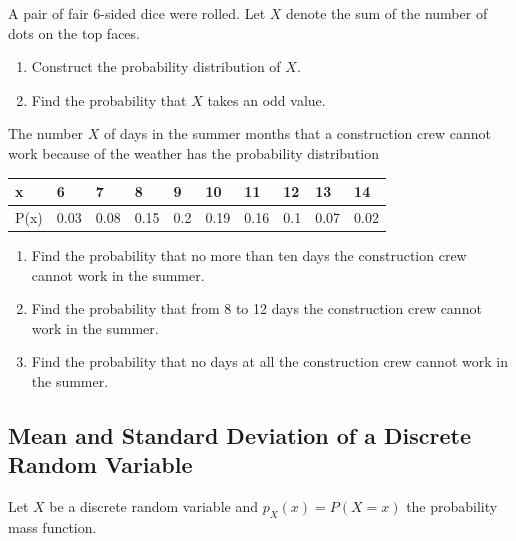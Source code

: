 \begin{exercise}

A pair of fair 6-sided dice were rolled. Let \(X\) denote the sum of the
number of dots on the top faces.

\begin{enumerate}
\item
  Construct the probability distribution of \(X\).
\item
  Find the probability that \(X\) takes an odd value.
\end{enumerate}

\end{exercise}

\begin{exercise}

The number \(X\) of days in the summer months that a construction crew
cannot work because of the weather has the probability distribution

\begin{longtable}[]{@{}llllllllll@{}}
\toprule()
x & 6 & 7 & 8 & 9 & 10 & 11 & 12 & 13 & 14 \\
\midrule()
\endhead
P(x) & 0.03 & 0.08 & 0.15 & 0.2 & 0.19 & 0.16 & 0.1 & 0.07 & 0.02 \\
\bottomrule()
\end{longtable}

\begin{enumerate}
\item
  Find the probability that no more than ten days the construction crew cannot work in the
  summer.
\item
  Find the probability that from 8 to 12 days the construction crew cannot work in the summer.
\item
  Find the probability that no days at all the construction crew cannot work in the summer.
\end{enumerate}

\end{exercise}

\hypertarget{mean-and-standard-deviation-of-a-discrete-random-variable}{%
\subsection{Mean and Standard Deviation of a Discrete Random
Variable}\label{mean-and-standard-deviation-of-a-discrete-random-variable}}

Let \(X\) be a discrete random variable and \(p_X(x)=P(X=x)\) the
probability mass function.

